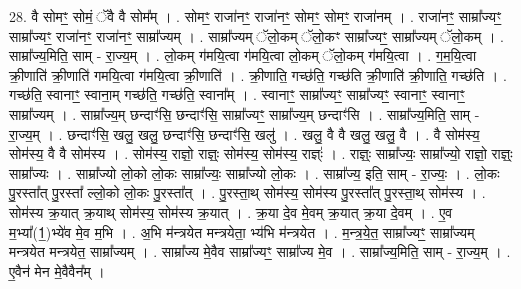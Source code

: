 \documentclass[17pt]{extarticle}
\begin{document}
28. वै सोमꣳ॒॒ सोमं॒ ॅवै वै सोम᳚म् । . सोमꣳ॒॒ राजा॑नꣳ॒॒ राजा॑नꣳ॒॒ सोमꣳ॒॒ सोमꣳ॒॒ राजा॑नम् । . राजा॑नꣳ॒॒ साम्रा᳚ज्यꣳ॒॒ साम्रा᳚ज्यꣳ॒॒ राजा॑नꣳ॒॒ राजा॑नꣳ॒॒ साम्रा᳚ज्यम् । . साम्रा᳚ज्यम् ॅलो॒कम् ॅलो॒कꣳ साम्रा᳚ज्यꣳ॒॒ साम्रा᳚ज्यम् ॅलो॒कम् । . साम्रा᳚ज्य॒मिति॒ साम् - रा॒ज्य॒म् । . लो॒कम् ग॑मयि॒त्वा ग॑मयि॒त्वा लो॒कम् ॅलो॒कम् ग॑मयि॒त्वा । . ग॒म॒यि॒त्वा क्री॒णाति॑ क्री॒णाति॑ गमयि॒त्वा ग॑मयि॒त्वा क्री॒णाति॑ । . क्री॒णाति॒ गच्छ॑ति॒ गच्छ॑ति क्री॒णाति॑ क्री॒णाति॒ गच्छ॑ति । . गच्छ॑ति॒ स्वानाꣳ॒॒ स्वाना॒म् गच्छ॑ति॒ गच्छ॑ति॒ स्वाना᳚म् । . स्वानाꣳ॒॒ साम्रा᳚ज्यꣳ॒॒ साम्रा᳚ज्यꣳ॒॒ स्वानाꣳ॒॒ स्वानाꣳ॒॒ साम्रा᳚ज्यम् । . साम्रा᳚ज्य॒म् छन्दाꣳ॑सि॒ छन्दाꣳ॑सि॒ साम्रा᳚ज्यꣳ॒॒ साम्रा᳚ज्य॒म् छन्दाꣳ॑सि । . साम्रा᳚ज्य॒मिति॒ साम् - रा॒ज्य॒म् । . छन्दाꣳ॑सि॒ खलु॒ खलु॒ छन्दाꣳ॑सि॒ छन्दाꣳ॑सि॒ खलु॑ । . खलु॒ वै वै खलु॒ खलु॒ वै । . वै सोम॑स्य॒ सोम॑स्य॒ वै वै सोम॑स्य । . सोम॑स्य॒ राज्ञो॒ राज्ञ्ः॒ सोम॑स्य॒ सोम॑स्य॒ राज्ञ्ः॑ । . राज्ञ्ः॒ साम्रा᳚ज्यः॒ साम्रा᳚ज्यो॒ राज्ञो॒ राज्ञ्ः॒ साम्रा᳚ज्यः । . साम्रा᳚ज्यो लो॒को लो॒कः साम्रा᳚ज्यः॒ साम्रा᳚ज्यो लो॒कः । . साम्रा᳚ज्य॒ इति॒ साम् - रा॒ज्यः॒ । . लो॒कः पु॒रस्ता᳚त् पु॒रस्ता᳚ ल्लो॒को लो॒कः पु॒रस्ता᳚त् । . पु॒रस्ता॒थ् सोम॑स्य॒ सोम॑स्य पु॒रस्ता᳚त् पु॒रस्ता॒थ् सोम॑स्य । . सोम॑स्य क्र॒यात् क्र॒याथ् सोम॑स्य॒ सोम॑स्य क्र॒यात् । . क्र॒या दे॒व मे॒वम् क्र॒यात् क्र॒या दे॒वम् । . ए॒व म॒भ्या᳚(1॒)भ्ये॑व मे॒व म॒भि । . अ॒भि म॑न्त्रयेत मन्त्रयेता॒ भ्य॑भि म॑न्त्रयेत । . म॒न्त्र॒ये॒त॒ साम्रा᳚ज्यꣳ॒॒ साम्रा᳚ज्यम् मन्त्रयेत मन्त्रयेत॒ साम्रा᳚ज्यम् । . साम्रा᳚ज्य मे॒वैव साम्रा᳚ज्यꣳ॒॒ साम्रा᳚ज्य मे॒व । . साम्रा᳚ज्य॒मिति॒ साम् - रा॒ज्य॒म् । . ए॒वैन॑ मेन मे॒वैवैन᳚म् । \newline
\end{document}
